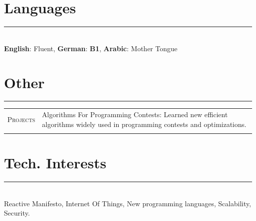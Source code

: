 \documentclass[a4paper,13pt]{article}
\begin{document}
\begin{adjustwidth}{-3cm}{}

\section{Languages}
\rule[0pt]{20cm}{0.5pt}\\
\textbf{English}: Fluent, 
\textbf{German}: \textbf{B1}, 
\textbf{Arabic}: Mother Tongue\\

\section{Other} \label{praktikum}
\rule[0pt]{20cm}{0.5pt}

\begin{tabular}{r|p{17.5cm}}
	\textsc{Projects} &Algorithms For Programming Contests: Learned new efficient algorithms widely used in programming contests and optimizations. 	\\\multicolumn{1}{c}{} 
	
\end{tabular}


\section{Tech. Interests}
\rule[0pt]{20cm}{0.5pt}     \\  
Reactive Manifesto, Internet Of Things, New programming languages, Scalability, Security.\\



\end{adjustwidth}
\end{document}

